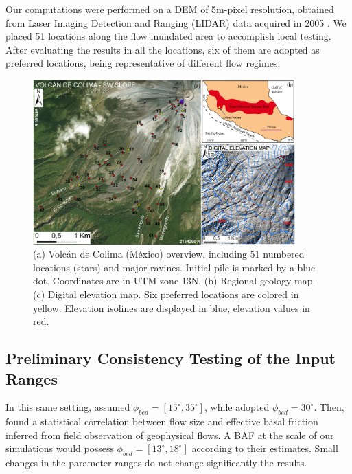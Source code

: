 \documentclass{article}
\begin{document}
Our computations were performed on a DEM of 5m-pixel resolution, obtained from Laser Imaging Detection and Ranging (LIDAR) data acquired in 2005 \citep{Davila2007, Sulpizio2010}. We placed 51 locations along the flow inundated area to accomplish local testing. After evaluating the results in all the locations, six of them are adopted as preferred locations, being representative of different flow regimes.
\begin{figure}[H]
    \includegraphics[width=0.90\textwidth]{ColimaFig.jpg}
    \centering
    \caption{(a) Volc{\'a}n de Colima (M{\'e}xico) overview, including 51 numbered locations (stars) and major ravines. Initial pile is marked by a blue dot. Coordinates are in UTM zone 13N. (b) Regional geology map. (c) Digital elevation map. Six preferred locations are colored in yellow. Elevation isolines are displayed in blue, elevation values in red.}
    \label{fig:Colima-first}
\end{figure}

\subsection{Preliminary Consistency Testing of the Input Ranges}
In this same setting, \cite{Dalbey2008} assumed $\phi_{bed}=[15^\mathrm{\circ}, 35^\mathrm{\circ}]$, while \cite{Capra2011} adopted $\phi_{bed}=30^\mathrm{\circ}$. Then, \cite{Spiller2014,Bayarri2015,Ogburn2016} found a statistical correlation between flow size and effective basal friction inferred from field observation of geophysical flows. A BAF at the scale of our simulations would possess $\phi_{bed}=[13^\mathrm{\circ}, 18^\mathrm{\circ}]$ according to their estimates. Small changes in the parameter ranges do not change significantly the results.
\end{document}
